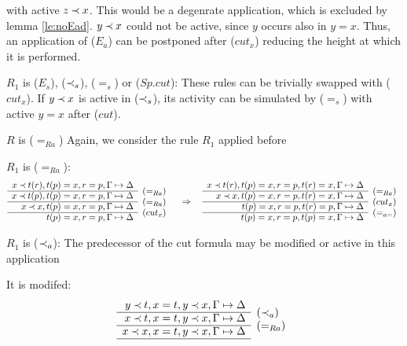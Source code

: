 \begin{PROOF}
\begin{LS}
\begin{LSA}
with active $z\mathbin{\prec} x$. This would be a degenrate application, which is
excluded by lemma \ref{le:noEad}. $y\mathbin{\prec} x$ could not be active, since $y$
occurs also in $y=x$. Thus, an application of ($E_a$) can be postponed after
($cut_x$) reducing the height at which it is performed.
\item $R_1$ is ($E_s$), ($\mathbin{\prec}_s$), ($=_s$) or ($Sp.cut$): These rules can
be trivially swapped with ($cut_x$). If $y\mathbin{\prec} x$ is active in ($\mathbin{\prec}_s$),
its activity can be simulated by ($=_s$) with active $y=x$ after ($cut$).
\end{LSA}
%
\item $R$ is ($=_{Ra}$)
Again, we consider the rule $R_1$ applied before
\begin{LSA}
\item $R_1$ is ($=_{Ra}$):
{\scriptsize \[ \begin{array}{rl}
x\Incl t(r), t(p)=x, r=p,\GSD  \\ \cline{1-1}
x\Incl t(p), t(p)=x, r=p, \GSD & \rabove{(=_{Ra})} \\ \cline{1-1}
x\Incl x,  t(p)=x, r=p, \GSD & \rabove{(=_{Ra})} \\ \cline{1-1}
           t(p)=x, r=p,\GSD & \rabove{(cut_x)} \end{array}  \conv 
 \begin{array}{rl}
x\Incl t(r), t(p)=x, r=p, t(r)=x,\GSD  \\ \cline{1-1}
x\Incl x, t(p)=x, r=p, t(r)=x,\GSD & \rabove{(=_{Ra})} \\ \cline{1-1}
   t(p)=x, r=p, t(r)=p,\GSD & \rabove{(cut_x)} \\ \cline{1-1}
           t(p)=x, r=p, t(p)=x, \GSD & \rabove{(=_{a=})} \end{array} \] }
\item $R_1$ is ($\mathbin{\prec}_a$):
The predecessor of the cut formula may be modified or active in this application
\begin{LSB}
 \item\label{it:modIncl} It is modifed:
 \[ \begin{array}{rl}
 y\Incl t, x=t, y\Incl x, \GSD \\ \cline{1-1}
 x\Incl t, x=t, y\Incl x, \GSD & \rabove{(\Incl_a)} \\ \cline{1-1}
 x\Incl x, x=t, y\Incl x, \GSD & \rabove{(=_{Ra})} \\ \cline{1-1}

\end{array}\]
\end{LSB}
\end{LSA}
\end{LS}
\end{PROOF}
